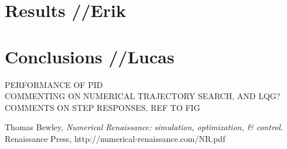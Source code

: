 \documentclass{article}
\begin{document}
\section{Results //Erik}


\section{Conclusions //Lucas}
PERFORMANCE OF PID \\
COMMENTING ON NUMERICAL TRAJECTORY SEARCH, AND LQG? \\
COMMENTS ON STEP RESPONSES, REF TO FIG \\

\newpage
\begin{thebibliography}{9}
  Thomas Bewley,
  \emph{Numerical Renaissance: simulation, optimization, \& control}.
  Renaissance Press,
  http://numerical-renaissance.com/NR.pdf

\end{thebibliography}
\end{document}
